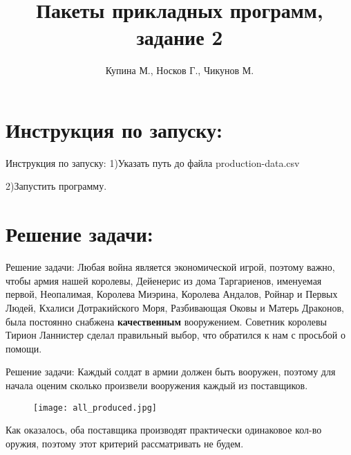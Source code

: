 \documentclass{beamer}
\begin{document}
\title{Пакеты прикладных программ, задание 2}
\author{Купина М., Носков Г., Чикунов М.}
\section{Инструкция по запуску:}

\frame{\titlepage}

\begin{frame}{Инструкция по запуску:}
1)Указать путь до файла production-data.csv

2)Запустить программу.

\end{frame}
\section{Решение задачи:}

\begin{frame}{Решение задачи:}
Любая война является экономической игрой, поэтому важно, чтобы армия нашей королевы, Дейенерис из дома
Таргариенов, именуемая первой, Неопалимая, Королева Миэрина, Королева Андалов, Ройнар и Первых Людей, Кхалиси
Дотракийского Моря, Разбивающая Оковы и Матерь Драконов, была постоянно снабжена \textbf{качественным} вооружением. Советник королевы Тирион Ланнистер сделал правильный выбор, что обратился к нам с просьбой о помощи.
\end{frame}

\begin{frame}{Решение задачи:}
Каждый солдат в армии должен быть вооружен, поэтому для начала оценим сколько произвели вооружения каждый из поставщиков.
\begin{figure}
\begin{center}
\texttt{[image: all\_produced.jpg]}
\end{center}
\end{figure}
Как оказалось, оба поставщика производят практически одинаковое кол-во оружия, поэтому этот критерий рассматривать не будем.

\end{frame}
\end{document}
